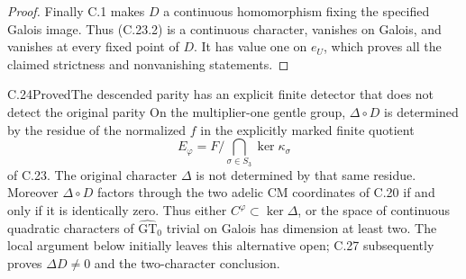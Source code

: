 \begin{proof}
Finally C.1 makes $D$ a continuous homomorphism
fixing the specified Galois image. Thus (C.23.2)
is a continuous character, vanishes on Galois,
and vanishes at every fixed point of $D$.
It has value one on $e_U$, which proves all the
claimed strictness and nonvanishing statements.
\end{proof}

\begin{statement}{C.24}{Proved}{The descended parity has an explicit finite detector that does not detect the original parity}
On the multiplier-one gentle group, $\Delta\circ D$
is determined by the residue of the normalized $f$
in the explicitly marked finite quotient
\[
 E_\varphi=F\Big/\bigcap_{\sigma\in S_3}\ker\kappa_\sigma
 \tag{C.24.1}
\]
of C.23. The original character $\Delta$ is not
determined by that same residue. Moreover
$\Delta\circ D$ factors through the two adelic CM
coordinates of C.20 if and only if it is identically
zero. Thus either $C^\varphi\subset\ker\Delta$,
or the space of continuous quadratic characters
of $\widehat{\mathrm{GT}}_0$ trivial on Galois
has dimension at least two. The local argument below
initially leaves this alternative open; C.27 subsequently
proves $\Delta D\ne0$ and the two-character conclusion.
\end{statement}
